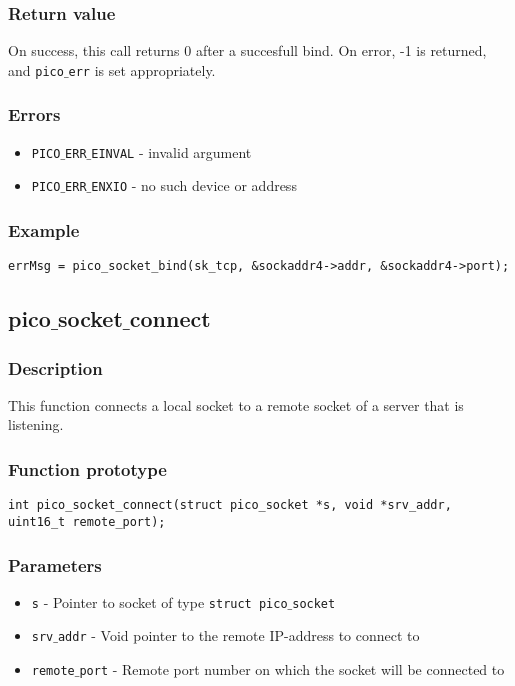 \subsubsection*{Return value}
On success, this call returns 0 after a succesfull bind.
On error, -1 is returned, and \texttt{pico$\_$err} is set appropriately.

\subsubsection*{Errors}
\begin{itemize}[noitemsep]
\item \texttt{PICO$\_$ERR$\_$EINVAL} - invalid argument
\item \texttt{PICO$\_$ERR$\_$ENXIO} - no such device or address
\end{itemize}

\subsubsection*{Example}
\begin{verbatim}
errMsg = pico_socket_bind(sk_tcp, &sockaddr4->addr, &sockaddr4->port);
\end{verbatim}


\subsection{pico$\_$socket$\_$connect}

\subsubsection*{Description}
This function connects a local socket to a remote socket of a server that is listening.

\subsubsection*{Function prototype}
\begin{verbatim}
int pico_socket_connect(struct pico_socket *s, void *srv_addr, uint16_t remote_port);
\end{verbatim}


\subsubsection*{Parameters}
\begin{itemize}[noitemsep]
\item \texttt{s} - Pointer to socket of type \texttt{struct pico$\_$socket}
\item \texttt{srv$\_$addr} - Void pointer to the remote IP-address to connect to
\item \texttt{remote$\_$port} - Remote port number on which the socket will be connected to
\end{itemize} 

